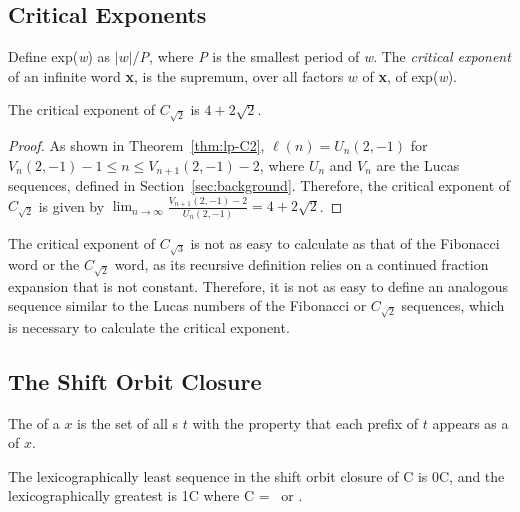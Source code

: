 \subsection{Critical Exponents}
Define exp(\textit{w}) as $|\textit{w}|$/\textit{P}, where \textit{P} is the smallest period of \textit{w}. 
The \textit{critical exponent} of an infinite word \textbf{x}, is the supremum, over all factors $w$ of \textbf{x}, of exp(\textit{w}).

\begin{theorem}
The critical exponent of $C_{\sqrt{2}}$ is $4 + 2\sqrt{2}$.
\end{theorem}
\begin{proof}
As shown in Theorem~\ref{thm:lp-C2}, $\ell(n) = U_n(2,-1)$ for $V_n(2,-1) - 1 \leq n \leq V_{n+1}(2,-1) - 2$, where $U_n$ and $V_n$ are the Lucas sequences, defined in Section~\ref{sec:background}.
Therefore, the critical exponent of $C_{\sqrt{2}}$ is given by $\lim_{n \to \infty} \frac{V_{n+1}(2,-1) - 2}{U_n(2,-1)} = 4 + 2\sqrt{2}$.
\end{proof}

\begin{remark}
The critical exponent of $C_{\sqrt{3}}$ is not as easy to calculate as that of the Fibonacci word or the $C_{\sqrt{2}}$ word, as its recursive definition relies on a continued fraction expansion that is not constant. Therefore, it is not as easy to define an analogous sequence similar to the Lucas numbers of the Fibonacci or $C_{\sqrt{2}}$ sequences, which is necessary to calculate the critical exponent. 
\end{remark}


\subsection{The Shift Orbit Closure}
The  of a \word $x$ is the set of all \word{}s $t$ with the property that each prefix of $t$ appears as a \factor of $x$.

\begin{theorem}
The lexicographically least sequence in the shift orbit closure of C is 0C, and the lexicographically greatest is 1C where C = \Ctwo\ or \Cthree. 
\end{theorem}

